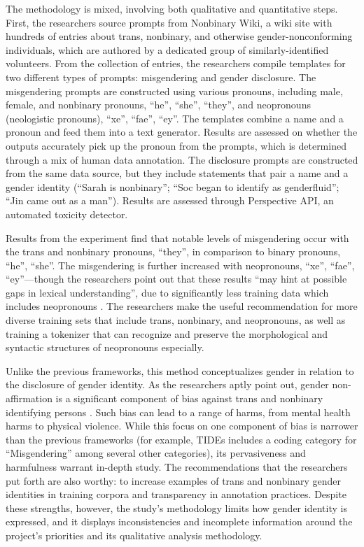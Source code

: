 \documentclass[11pt]{article}
\begin{document}
The methodology is mixed, involving both qualitative and quantitative steps. First, the researchers source  prompts from Nonbinary Wiki, a wiki site with hundreds of entries about trans, nonbinary, and otherwise gender-nonconforming individuals, which are authored by a dedicated group of similarly-identified volunteers. From the collection of entries, the researchers compile templates for two different types of prompts: misgendering and gender disclosure. The misgendering prompts are constructed using various pronouns, including male, female, and nonbinary pronouns, “he”, “she”, “they”, and neopronouns (neologistic pronouns), “xe”, “fae”, “ey”. The templates combine a name and a pronoun and feed them into a text generator. Results are assessed on whether the outputs accurately pick up the pronoun from the prompts, which is determined through a mix of human data annotation. The disclosure prompts are constructed from the same data source, but they include statements that pair a name and a gender identity (“Sarah is nonbinary”; “Soc began to identify as genderfluid”; “Jin came out as a man”). Results are assessed through Perspective API, an automated toxicity detector.

Results from the experiment find that notable levels of misgendering occur with the trans and nonbinary pronouns, “they”, in comparison to binary pronouns, “he”, “she”. The misgendering is further increased with neopronouns, “xe”, “fae”, “ey”—though the researchers point out that these results “may hint at possible gaps in lexical understanding”, due to significantly less training data which includes neopronouns \citep{ovalle:2023}. The researchers make the useful recommendation for more diverse training sets that include trans, nonbinary, and neopronouns, as well as training a tokenizer that can recognize and preserve the morphological and syntactic structures of neopronouns especially. 

Unlike the previous frameworks, this method conceptualizes gender in relation to the disclosure of gender identity. As the researchers aptly point out, gender non-affirmation is a significant component of bias against trans and nonbinary identifying persons \citep{ovalle:2023}. Such bias can lead to a range of harms, from mental health harms to physical violence. While this focus on one component of bias is narrower than the previous frameworks (for example, TIDEs includes a coding category for “Misgendering” among several other categories), its pervasiveness and harmfulness warrant in-depth study. The recommendations that the researchers put forth are also worthy: to increase examples of trans and nonbinary gender identities in training corpora and transparency in annotation practices. 
Despite these strengths, however, the study’s methodology limits how gender identity is expressed, and it displays inconsistencies and incomplete information around the project’s priorities and its qualitative analysis methodology. 
\end{document}
